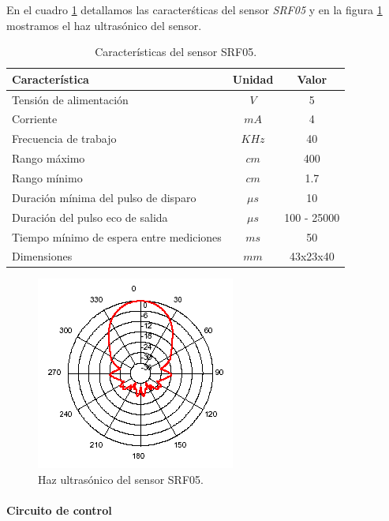 En el cuadro \ref{hT_srf05} detallamos las caracter\'sticas del sensor \emph{SRF05} y en la figura \ref{hF_srf05} mostramos el haz ultras\'onico
del sensor.

\begin{table}[ht]
	\begin{center}
		\begin{tabular}{|l|c|c|}
			\hline
			Caracter\'istica & Unidad & Valor\\
			\hline
			Tensi\'on de alimentaci\'on & $V$ & 5 \\
			Corriente & $mA$ & 4 \\
			Frecuencia de trabajo & $KHz$ & 40 \\
			Rango m\'aximo & $cm$ & 400 \\
			Rango m\'inimo & $cm$ & 1.7 \\
			Duraci\'on m\'inima del pulso de disparo & $\mu s$ & 10 \\
			Duraci\'on del pulso eco de salida & $\mu s$& 100 - 25000 \\
			Tiempo m\'inimo de espera entre mediciones & $m s$ & 50 \\
			Dimensiones & $mm$ & 43x23x40 \\
			\hline
		\end{tabular}
	\end{center}
	\caption{Caracter\'isticas del sensor SRF05.}
	\label{hT_srf05}
\end{table}

\begin{figure}[ht]
	\centering
	\includegraphics[scale=0.5]{figuras/srf05_beam.png}
	\caption{Haz ultras\'onico del sensor SRF05.}
	\label{hF_srf05}
\end{figure}

\paragraph{Circuito de control}
\label{h_sensado_ultrasonido_circuito}

